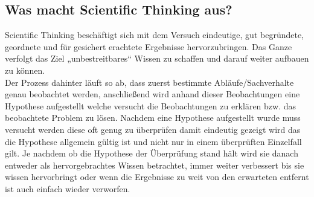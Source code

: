 
\subsection{Was macht Scientific Thinking aus?}
Scientific Thinking\cite{slidesScientifc} beschäftigt sich mit dem Versuch eindeutige, gut begründete, geordnete und für gesichert erachtete Ergebnisse hervorzubringen. Das Ganze verfolgt das Ziel „unbestreitbares“ Wissen zu schaffen und darauf weiter aufbauen zu können. \\
Der Prozess dahinter läuft so ab, dass zuerst bestimmte Abläufe/Sachverhalte genau beobachtet werden, anschließend wird anhand dieser Beobachtungen eine Hypothese aufgestellt welche versucht die Beobachtungen zu erklären bzw. das beobachtete Problem zu lösen. Nachdem eine Hypothese aufgestellt wurde muss versucht werden diese oft genug zu überprüfen damit eindeutig gezeigt wird das die Hypothese allgemein gültig ist und nicht nur in einem überprüften Einzelfall gilt. Je nachdem ob die Hypothese der Überprüfung stand hält wird sie danach entweder als hervorgebrachtes Wissen betrachtet, immer weiter verbessert bis sie wissen hervorbringt oder wenn die Ergebnisse zu weit von den erwarteten entfernt ist auch einfach wieder verworfen.

